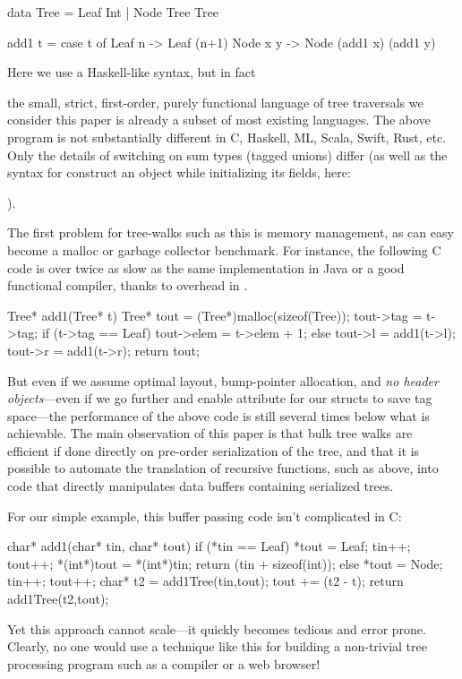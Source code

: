 \documentclass[a4paper,english]{lipics-v2016}
\newif\ifcurly
\begin{document}
\ifcurly
\begin{code}[language=c]
type Tree = Leaf(Int) | Node(Tree,Tree);

fun add1(t) {
  match(t) {
    Leaf(n):   return Leaf(n+1);
    Node(x,y): return Node(add1(x),add1(y));
  }}
\end{code}
\else
\begin{code}
 data Tree = Leaf Int | Node Tree Tree
  
 add1 t = case t of
            Leaf n   -> Leaf (n+1)
            Node x y -> Node (add1 x) (add1 y)
\end{code}
\fi

\ifcurly
In fact,
\else
Here we use a Haskell-like syntax, but in fact
\fi
 the small, strict, first-order, purely functional language of tree traversals
we consider this paper is already a subset of most existing languages.
The above program is not substantially different in C, Haskell, ML, Scala,
Swift, Rust, etc.  Only the details of switching on sum types (tagged unions)
differ (as well as the syntax for construct an object while initializing its
fields, here: 
\ifcurly
\il{Node(e1,e2)}).
\else
{}).
\fi


The first problem for tree-walks such as this is memory management, as 
can easy become a malloc or garbage collector benchmark.  For instance, the
following C code is over twice as slow as the same implementation in Java or a
good functional compiler, thanks to overhead in .

\begin{cpp}
  Tree* add1(Tree* t) {
    Tree* tout = (Tree*)malloc(sizeof(Tree));
    tout->tag = t->tag;
    if (t->tag == Leaf) {
      tout->elem = t->elem + 1;
    } else {
      tout->l = add1(t->l);
      tout->r = add1(t->r);
    }
    return tout;
  }
\end{cpp}

But even if we assume optimal layout, bump-pointer allocation, and {\em no
  header objects}---even if we go further and enable  attribute
for our structs to save tag space---the performance of the above code is still
several times below what is achievable.  The main observation of this paper is
that bulk tree walks are efficient if done directly on pre-order serialization
of the tree, and that it is possible to automate the translation of recursive
functions, such as  above, into code that directly manipulates data
buffers containing serialized trees.

For our simple example, this buffer passing code isn't complicated in C:
%
\begin{code}[language=c]
char* add1(char* tin, char* tout) {
  if (*tin == Leaf) {
    *tout = Leaf;
    tin++; tout++;
    *(int*)tout = *(int*)tin;
    return (tin + sizeof(int));
  } else {
    *tout = Node;
    tin++; tout++;
    char* t2 = add1Tree(tin,tout);
    tout += (t2 - t);
    return add1Tree(t2,tout);
  }
}
\end{code}
%
Yet this approach cannot scale---it quickly becomes tedious and error prone.
Clearly, no one would use a technique like this for building a
non-trivial tree processing program such as a compiler or a web browser!
\end{document}
